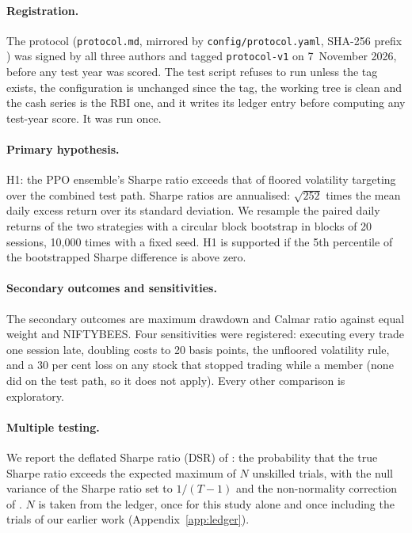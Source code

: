 \documentclass[11pt]{article}
\begin{document}
\paragraph{Registration.} The protocol (\texttt{protocol.md}, mirrored by \texttt{config/protocol.yaml}, SHA-256 prefix \ProtoHash{}) was signed by all three authors and tagged \texttt{protocol-v1} on 7~November 2026, before any test year was scored. The test script refuses to run unless the tag exists, the configuration is unchanged since the tag, the working tree is clean and the cash series is the RBI one, and it writes its ledger entry before computing any test-year score. It was run once.

\paragraph{Primary hypothesis.} H1: the PPO ensemble's Sharpe ratio exceeds that of floored volatility targeting over the combined test path. Sharpe ratios are annualised: $\sqrt{252}$ times the mean daily excess return over its standard deviation. We resample the paired daily returns of the two strategies with a circular block bootstrap \citep{politis1992} in blocks of 20 sessions, 10{,}000 times with a fixed seed. H1 is supported if the 5th percentile of the bootstrapped Sharpe difference is above zero.

\paragraph{Secondary outcomes and sensitivities.} The secondary outcomes are maximum drawdown and Calmar ratio against equal weight and NIFTYBEES. Four sensitivities were registered: executing every trade one session late, doubling costs to 20 basis points, the unfloored volatility rule, and a 30 per cent loss on any stock that stopped trading while a member (none did on the test path, so it does not apply). Every other comparison is exploratory.

\paragraph{Multiple testing.} We report the deflated Sharpe ratio (DSR) of \citet{bailey2014dsr}: the probability that the true Sharpe ratio exceeds the expected maximum of $N$ unskilled trials, with the null variance of the Sharpe ratio set to $1/(T-1)$ and the non-normality correction of \citet{bailey2012psr}. $N$ is taken from the ledger, once for this study alone and once including the trials of our earlier work (Appendix~\ref{app:ledger}).
\end{document}
